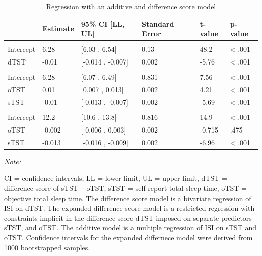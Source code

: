 \documentclass[
]{article}
\begin{document}
\begin{table}[!h]
\centering
\caption{\label{tab:regressions}Regression with an additive and difference score model}
\centering
\fontsize{10}{12}\selectfont
\begin{threeparttable}
\begin{tabular}[t]{llllll}
\toprule
  & Estimate & 95\% CI [LL, UL] & Standard Error & t-value & p-value\\
\midrule
\addlinespace[0.3em]
\multicolumn{6}{l}{\textbf{Difference score model}}\\
\hspace{1em}Intercept & 6.28 & {}[6.03 , 6.54] & 0.13 & 48.2 & < .001\\
\hspace{1em}dTST & -0.01 & {}[-0.014 , -0.007] & 0.002 & -5.76 & < .001\\
\addlinespace[0.3em]
\multicolumn{6}{l}{\textbf{Expanded difference score model}}\\
\hspace{1em}Intercept & 6.28 & {}[6.07 , 6.49] & 0.831 & 7.56 & < .001\\
\hspace{1em}oTST & 0.01 & {}[0.007 , 0.013] & 0.002 & 4.21 & < .001\\
\hspace{1em}sTST & -0.01 & {}[-0.013 , -0.007] & 0.002 & -5.69 & < .001\\
\addlinespace[0.3em]
\multicolumn{6}{l}{\textbf{Additive model}}\\
\hspace{1em}Intercept & 12.2 & {}[10.6 , 13.8] & 0.816 & 14.9 & < .001\\
\hspace{1em}oTST & -0.002 & {}[-0.006 , 0.003] & 0.002 & -0.715 & .475\\
\hspace{1em}sTST & -0.013 & {}[-0.016 , -0.009] & 0.002 & -6.96 & < .001\\
\bottomrule
\end{tabular}
\begin{tablenotes}[para]
\item \textit{Note: } 
\item CI = confidence intervals, LL = lower limit, UL = upper limit, dTST = difference score of sTST -- oTST, sTST = self-report total sleep time, oTST = objective total sleep time. The difference score model is a bivariate regression of ISI on dTST. The expanded difference score model is a restricted regression with constraints implicit in the difference score dTST imposed on separate predictors sTST, and oTST. The additive model is a multiple regression of ISI on sTST and oTST. Confidence intervals for the expanded differnece model were derived from 1000 bootstrapped samples.
\end{tablenotes}
\end{threeparttable}
\end{table}
\end{document}
